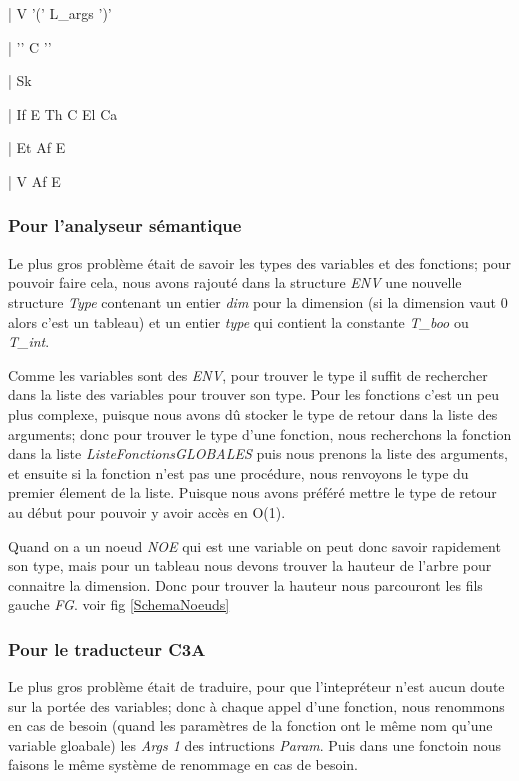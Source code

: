 \documentclass[10pt,a4paper]{article}
\begin{document}
| V '(' L\_args ')'
    
| '{' C '}'
    
| Sk
    
| If E Th C El Ca
    
| Et Af E

| V Af E



\subsubsection {Pour l'analyseur sémantique}
Le plus gros problème était de savoir les types des variables et des fonctions; pour pouvoir faire cela, nous avons rajouté dans la structure \textit{ENV} une nouvelle structure \textit{Type} contenant un entier \textit{dim} pour la dimension (si la dimension vaut 0 alors c'est un tableau) et un entier \textit{type} qui contient la constante \textit{T\_boo} ou \textit{T\_int}.

Comme les variables sont des \textit{ENV}, pour trouver le type il suffit de rechercher dans la liste des variables pour trouver son type. Pour les fonctions c'est un peu plus complexe, puisque nous avons dû stocker le type de retour dans la liste des arguments; donc pour trouver le type d'une fonction, nous recherchons la fonction dans la liste \textit{ListeFonctionsGLOBALES} puis nous prenons la liste des arguments, et ensuite si la fonction n'est pas une procédure, nous renvoyons le type du premier élement de la liste. Puisque nous avons préféré mettre le type de retour au début pour pouvoir y avoir accès en O(1).

Quand on a un noeud \textit{NOE} qui est une variable on peut donc savoir rapidement son type, mais pour un tableau nous devons trouver la hauteur de l'arbre pour connaitre la dimension. Donc pour trouver la hauteur nous parcouront les fils gauche \textit{FG}. voir fig \ref{SchemaNoeuds}


\subsubsection{Pour le traducteur C3A}
Le plus gros problème était de traduire, pour que l'intepréteur n'est aucun doute sur la portée des variables; donc à chaque appel d'une fonction, nous renommons en cas de besoin (quand les paramètres de la fonction ont le même nom qu'une variable gloabale) les \textit{Args 1} des intructions \textit{Param}. Puis dans une fonctoin nous faisons le même système de renommage en cas de besoin.
\end{document}
